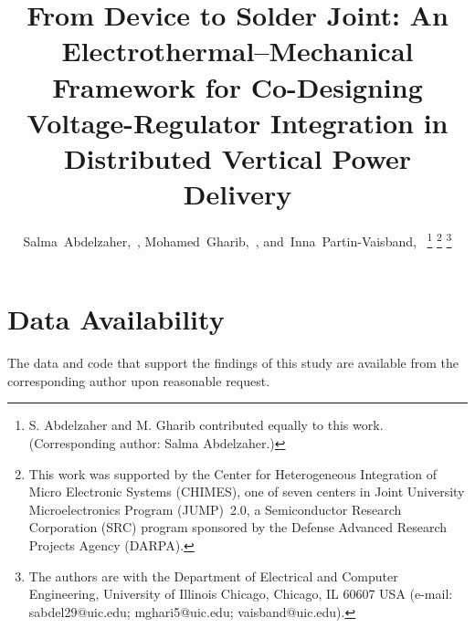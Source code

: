 \documentclass[journal]{IEEEtran}
\begin{document}
\title{From Device to Solder Joint: An Electrothermal--Mechanical Framework for Co-Designing
Voltage-Regulator Integration in Distributed Vertical Power Delivery}

\author{Salma~Abdelzaher,~,
        Mohamed~Gharib,~,
        and~Inna~Partin-Vaisband,~%
\thanks{S. Abdelzaher and M. Gharib contributed equally to this work. (Corresponding author:
Salma Abdelzaher.)}%
\thanks{This work was supported by the Center for Heterogeneous Integration of Micro 
Electronic Systems (CHIMES), one of seven centers in Joint University Microelectronics Program 
(JUMP)~2.0, a Semiconductor Research Corporation (SRC) program sponsored by the Defense 
Advanced Research Projects Agency (DARPA).}%
\thanks{The authors are with the Department of Electrical and Computer Engineering, University
of Illinois Chicago, Chicago, IL 60607 USA (e-mail: sabdel29@uic.edu; mghari5@uic.edu;
vaisband@uic.edu).}}

\maketitle













\section*{Data Availability}
The data and code that support the findings of this study are available from the
corresponding author upon reasonable request.



\end{document}
